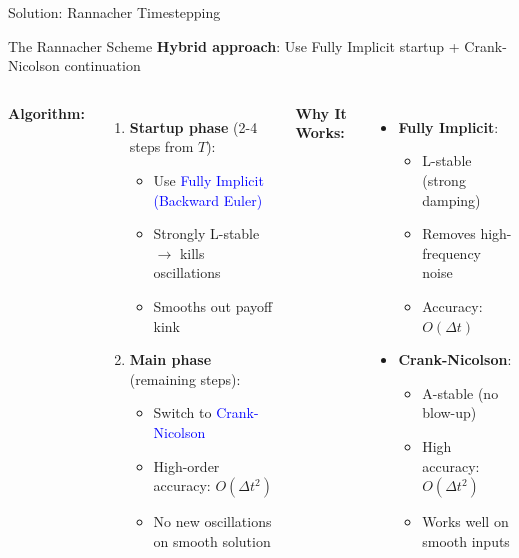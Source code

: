 \begin{frame}{Solution: Rannacher Timestepping}

\begin{block}{The Rannacher Scheme}
\textbf{Hybrid approach}: Use Fully Implicit startup + Crank-Nicolson continuation
\end{block}

\vspace{0.5em}
\begin{columns}
\textbf{Algorithm:}
\begin{enumerate}
    \item \textbf{Startup phase} (2-4 steps from $T$):
    \begin{itemize}
        \item Use \textcolor{blue}{Fully Implicit (Backward Euler)}
        \item Strongly L-stable $\rightarrow$ kills oscillations
        \item Smooths out payoff kink
    \end{itemize}

    \vspace{0.3em}
    \item \textbf{Main phase} (remaining steps):
    \begin{itemize}
        \item Switch to \textcolor{blue}{Crank-Nicolson}
        \item High-order accuracy: $O(\Delta t^2)$
        \item No new oscillations on smooth solution
    \end{itemize}
\end{enumerate}

\textbf{Why It Works:}

\begin{itemize}
    \item \textbf{Fully Implicit}:
    \begin{itemize}
        \item L-stable (strong damping)
        \item Removes high-frequency noise
        \item Accuracy: $O(\Delta t)$
    \end{itemize}

    \vspace{0.3em}
    \item \textbf{Crank-Nicolson}:
    \begin{itemize}
        \item A-stable (no blow-up)
        \item High accuracy: $O(\Delta t^2)$
        \item Works well on smooth inputs
    \end{itemize}
\end{itemize}


\end{columns}
\end{frame}
